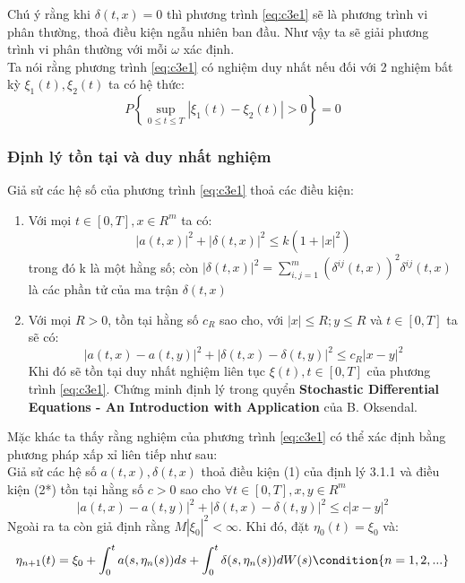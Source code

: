 \documentclass[14pt,a4paper]{article}
\numberwithin{equation}{section}
\begin{document}
Chú ý rằng khi $\delta(t,x)=0$ thì phương trình \eqref{eq:c3e1} sẽ là phương trình vi phân thường, thoả điều kiện ngẫu nhiên ban đầu. Như vậy ta sẽ giải phương trình vi phân thường với mỗi $\omega$ xác định.\\
Ta nói rằng phương trình \eqref{eq:c3e1} có nghiệm duy nhất nếu đối với 2 nghiệm bất kỳ $\xi_1(t),\xi_2(t)$ ta có hệ thức:\\
\begin{equation*}
	P\left\{\sup_{0\leq t\leq T}|\xi_1(t)-\xi_2(t)|>0 \right\}=0
\end{equation*}
\subsubsection{Định lý tồn tại và duy nhất nghiệm}
Giả sử các hệ số của phương trình \eqref{eq:c3e1} thoả các điều kiện:
\begin{enumerate}[(1)]
	\item Với mọi $t\in[0,T],x\in R^m$ ta có:
\begin{equation*}
	|a(t,x)|^2+|\delta(t,x)|^2\leq k(1+|x|^2)
\end{equation*}
trong đó k là một hằng số; còn $|\delta(t,x)|^2=\sum\limits_{i,j=1}^m(\delta^{ij}(t,x))^2\delta^{ij}(t,x)$ là các phần tử của ma trận $\delta(t,x)$
	\item Với mọi $R>0$, tồn tại hằng số $c_R$ sao cho, với $|x|\leq R;y\leq R$ và $t\in[0,T]$ ta sẽ có:
\begin{equation*}
	|a(t,x)-a(t,y)|^2+|\delta(t,x)-\delta(t,y)|^2\leq c_R|x-y|^2
\end{equation*}
Khi đó sẽ tồn tại duy nhất nghiệm liên tục $\xi(t),t\in[0,T]$ của phương trình \eqref{eq:c3e1}. Chứng minh định lý trong quyển \textbf{Stochastic Differential Equations - An Introduction with Application} của B. Oksendal.
\end{enumerate}
Mặc khác ta thấy rằng nghiệm của phương trình \eqref{eq:c3e1} có thể xác định bằng phương pháp xấp xỉ liên tiếp như sau:\\
Giả sử các hệ số $a(t,x),\delta(t,x)$ thoả điều kiện (1) của định lý 3.1.1 và điều kiện (2*) tồn tại hằng số $c>0$ sao cho $\forall t\in[0,T],x,y\in R^m$
\begin{equation*}
	|a(t,x)-a(t,y)|^2+|\delta(t,x)-\delta(t,y)|^2\leq c|x-y|^2
\end{equation*}
Ngoài ra ta còn giả định rằng $M|\xi_0|^2<\infty$. Khi đó, đặt $\eta_0(t)=\xi_0$ và:
\begin{equation*}
	\eta_{n+1}(t)=\xi_0+\int_{0}^ta(s,\eta_n(s))ds+\int_0^t\delta(s,\eta_n(s))dW(s) \condition{n=1,2,...}
\end{equation*}
\end{document}
